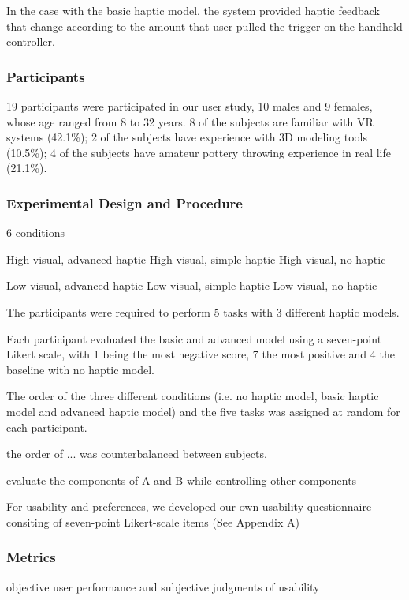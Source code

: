 In the case with the basic haptic model, the system provided haptic feedback that change according to the amount that user pulled the trigger on the handheld controller.


\subsubsection{Participants}
19 participants were participated in our user study, 10 males and 9 females, whose age ranged from 8 to 32 years. 8 of the subjects are familiar with VR systems (42.1\%); 2 of the subjects have experience with 3D modeling tools (10.5\%); 4 of the subjects have amateur pottery throwing experience in real life (21.1\%).


\subsubsection{Experimental Design and Procedure}

6 conditions

High-visual, advanced-haptic
High-visual, simple-haptic
High-visual, no-haptic

Low-visual, advanced-haptic
Low-visual, simple-haptic
Low-visual, no-haptic


The participants were required to perform 5 tasks with 3 different haptic models.

Each participant evaluated the basic and advanced model using a seven-point Likert scale, with 1 being the most negative score, 7 the most positive and 4 the baseline with no haptic model.

The order of the three different conditions (i.e. no haptic model, basic haptic model and advanced haptic model) and the five tasks was assigned at random for each participant.

the order of ... was counterbalanced between subjects.

evaluate the components of A and B while controlling other components


For usability and preferences, we developed our own usability questionnaire consiting of seven-point Likert-scale items (See Appendix A)

\subsubsection{Metrics}

objective user performance and subjective judgments of usability

